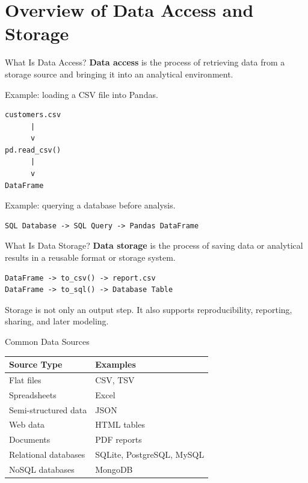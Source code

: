 \documentclass[aspectratio=169,11pt]{beamer}
\newcommand{\smallgap}{\vspace{0.4em}}
\begin{document}
\section{Overview of Data Access and Storage}

\begin{frame}[fragile]{What Is Data Access?}
\textbf{Data access} is the process of retrieving data from a storage source and bringing it into an analytical environment.

\smallgap
Example: loading a CSV file into Pandas.
\begin{lstlisting}[style=textstyle]
customers.csv
      |
      v
pd.read_csv()
      |
      v
DataFrame
\end{lstlisting}

Example: querying a database before analysis.
\begin{lstlisting}[style=textstyle]
SQL Database -> SQL Query -> Pandas DataFrame
\end{lstlisting}
\end{frame}

\begin{frame}[fragile]{What Is Data Storage?}
\textbf{Data storage} is the process of saving data or analytical results in a reusable format or storage system.

\begin{lstlisting}[style=textstyle]
DataFrame -> to_csv() -> report.csv
DataFrame -> to_sql() -> Database Table
\end{lstlisting}

\smallgap
Storage is not only an output step. It also supports reproducibility, reporting, sharing, and later modeling.
\end{frame}

\begin{frame}{Common Data Sources}
\begin{tabularx}{\textwidth}{lX}
\toprule
\textbf{Source Type} & \textbf{Examples} \\
\midrule
Flat files & CSV, TSV \\
Spreadsheets & Excel \\
Semi-structured data & JSON \\
Web data & HTML tables \\
Documents & PDF reports \\
Relational databases & SQLite, PostgreSQL, MySQL \\
NoSQL databases & MongoDB \\
\bottomrule
\end{tabularx}
\end{frame}
\end{document}
